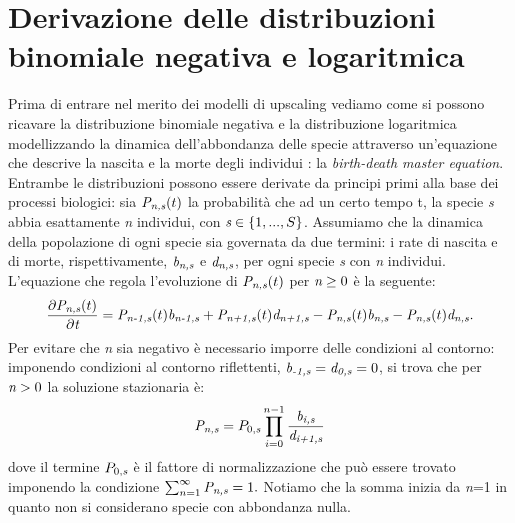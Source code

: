\chapter{Derivazione delle distribuzioni binomiale negativa e logaritmica}
Prima di entrare nel merito dei modelli di upscaling vediamo come si possono ricavare la distribuzione binomiale negativa e la distribuzione logaritmica modellizzando la dinamica dell'abbondanza delle specie attraverso un'equazione che descrive la nascita e la morte degli individui : la \emph{birth-death master equation}\cite{2016AzaelePeruzzo}.\\
Entrambe le distribuzioni possono essere derivate da principi primi alla base dei processi biologici: sia $\emph{P}_{\emph{n,s}}(t)$ la probabilità che ad un certo tempo t, la specie \emph{s} abbia esattamente \emph{n} individui, con $\emph{s}\in\left \{ 1,...,S \right \}$. Assumiamo che la dinamica della popolazione di ogni specie sia governata da due termini: i rate di nascita e di morte, rispettivamente, $\emph{b}_\emph{{n,s}}$ e $\emph{d}_\emph{{n,s}}$, per ogni specie \emph{s} con \emph{n} individui.
L'equazione che regola l'evoluzione di $\emph{P}_{\emph{n,s}}(t)$ per $\emph{n}\ge0$ è la seguente:
\begin{equation}
\frac{\partial\emph{P}_{\emph{n,s}}(t)}{\partial\emph{t}}=
\emph{P}_{\emph{n-1,s}}(t)\emph{b}_\emph{{n-1,s}}+\emph{P}_{\emph{n+1,s}}(t)\emph{d}_\emph{{n+1,s}}-\emph{P}_{\emph{n,s}}(t)\emph{b}_\emph{{n,s}}-\emph{P}_{\emph{n,s}}(t)\emph{d}_\emph{{n,s}}.
\label{eq:master}
\end{equation}
Per evitare che \emph{n} sia negativo è necessario imporre delle condizioni al contorno: imponendo condizioni al contorno riflettenti, $\emph{b}_\emph{{-1,s}}=\emph{d}_\emph{{0,s}}=0$, 
si trova che per $\emph{n}>0$ la soluzione stazionaria è:
\begin{equation}
\emph{P}_{\emph{n,s}}=P_{0,\emph{s}}\prod_{i=0}^{n-1}\frac{\emph{b}_\emph{{i,s}}}{\emph{d}_\emph{{i+1,s}}}
\label{eq:steadystate}
\end{equation}
dove il termine $P_{0,\emph{s}}$ è il fattore di normalizzazione che può essere trovato imponendo la condizione $\sum_{n=1}^\infty \emph{P}_{\emph{n,s}}=1.$ Notiamo che la somma inizia da \emph{n}=1 in quanto non si considerano specie con abbondanza nulla.\\



